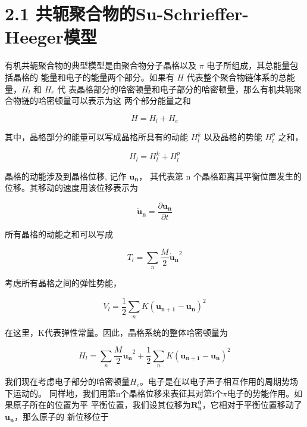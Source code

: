 \documentclass[12pt,]{report}
\begin{document}
\lhead{} 
\rhead{}

\section{2.1
共轭聚合物的Su-Schrieffer-Heeger模型}\label{ux5171ux8f6dux805aux5408ux7269ux7684su-schrieffer-heegerux6a21ux578b}

有机共轭聚合物的典型模型是由聚合物分子晶格以及 \(\pi\)
电子所组成，其总能量包括晶格的 能量和电子的能量两个部分。如果有 \(H\)
代表整个聚合物链体系的总能量，\(H_l\) 和 \(H_e\) 代
表晶格部分的哈密顿量和电子部分的哈密顿量，那么有机共轭聚合物链的哈密顿量可以表示为这
两个部分能量之和

\begin{equation}
H = H_l + H_e
\end{equation}

\noindent
其中，晶格部分的能量可以写成晶格所具有的动能 \(H_l^k\) 以及晶格的势能
\(H_l^p\) 之和，

\begin{equation}
H_l = H_l^k + H_l^p
\end{equation}

\noindent
晶格的动能涉及到晶格位移, 记作 \(\bm{u_n}\)， 其代表第 n
个晶格距离其平衡位置发生的位移。其移动的速度用该位移表示为

\begin{equation}
\bm{\dot{u}_n} = \frac{\partial \bm{u_n}}{\partial t}
\end{equation}

\noindent
所有晶格的动能之和可以写成

\begin{equation}
T_l = \sum\limits_{n}\frac{M}{2} \bm{\dot{u}_n}^2
\end{equation}

\noindent
考虑所有晶格之间的弹性势能，

\begin{equation}
V_l = \frac{1}{2}\sum\limits_n K (\bm{u_{n+1}} - \bm{u_n})^2
\end{equation}

\noindent
在这里，K代表弹性常量。因此，晶格系统的整体哈密顿量为

\begin{equation}
H_l = \sum\limits_{n}\frac{M}{2} \bm{\dot{u}_n}^2 + \frac{1}{2}\sum\limits_n K
(\bm{u_{n+1}} - \bm{u_n})^2
\end{equation}

我们现在考虑电子部分的哈密顿量\(H_e\)。电子是在以电子声子相互作用的周期势场下运动的。
同样地，我们用第n个晶格位移来表征其对第i个\(\pi\)电子的势能作用。如果原子所在的位置为平
平衡位置，我们设其位移为\(\bm{R_n^{0}}\)，它相对于平衡位置移动了\(\bm{u_n}\)，那么原子的
新位移位于
\end{document}
